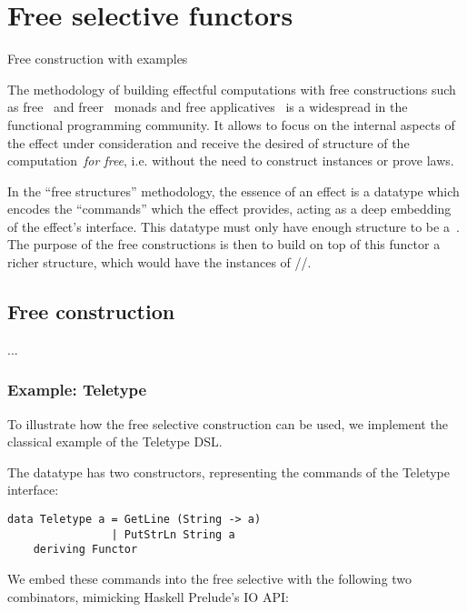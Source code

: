 \section{Free selective functors}\label{sec-free}

Free construction with examples

The methodology of building effectful computations with free constructions such
as free~\cite{free-monads} and freer~\cite{freer-monads} monads and free
applicatives~\cite{free-applicatives} is a widespread in the functional programming community.
It allows to focus on the internal aspects of the effect under consideration and receive the
desired  of  structure of the computation~\emph{for free},
i.e. without the need to construct instances or prove laws.

In the ``free structures'' methodology, the essence of an effect is a datatype which encodes
the ``commands'' which the effect provides, acting as a deep embedding of the effect's
interface. This datatype must only have enough structure to be a~. The purpose of
the free constructions is then to build on top of this functor a richer structure,
which would have the instances of //.

\subsection{Free construction}\label{sec-free-construction}

...

\subsubsection{\textbf{Example: Teletype}}

To illustrate how the free selective construction can be used, we implement the
classical example of the Teletype DSL.

The  datatype has two constructors, representing the commands of the
Teletype interface:

\begin{verbatim}
data Teletype a = GetLine (String -> a)
                | PutStrLn String a
    deriving Functor
\end{verbatim}

We embed these commands into the free selective with the following two combinators,
mimicking Haskell Prelude's IO API:

